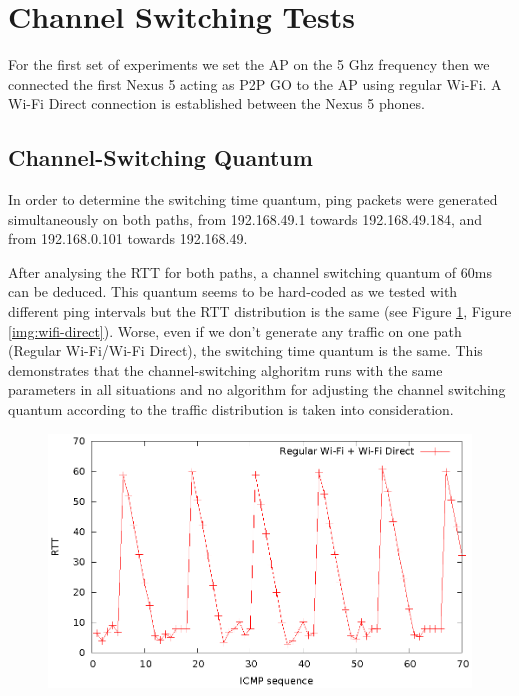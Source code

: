 \section{Channel Switching Tests}
\label{sec:nexus5-chsw}

For the first set of experiments we set the AP on the 5 Ghz frequency then we connected the first Nexus 5 acting as P2P GO to the AP using regular Wi-Fi. A Wi-Fi Direct connection is established between the Nexus 5 phones.
 

\subsection{Channel-Switching Quantum}
\label{sub-sec:chsw-time}

In order to determine the switching time quantum, ping packets were generated simultaneously on both paths, from 192.168.49.1 towards 192.168.49.184, and from 192.168.0.101 towards 192.168.49.

After analysing the RTT for both paths, a channel switching quantum of 60ms can be deduced. This quantum seems to be hard-coded as we tested with different ping intervals but the RTT distribution is the same (see Figure \ref{img:regular-wifi}, Figure \ref{img:wifi-direct}). Worse, even if we don't generate any traffic on one path (Regular Wi-Fi/Wi-Fi Direct), the switching time quantum is the same. This demonstrates that the channel-switching alghoritm runs with the same parameters in all situations and no algorithm for adjusting the channel switching quantum according to the traffic distribution is taken into consideration.

\begin{figure}[h!]
\includegraphics{src/img/regularwifi.eps}
\label{img:regular-wifi}
\end{figure}

